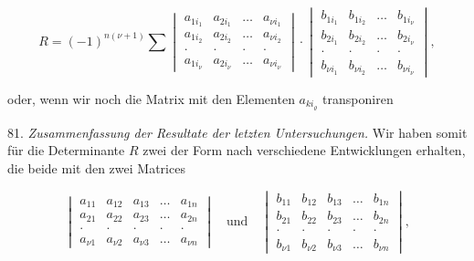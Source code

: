 \[
R=(-1)^{n(\nu+1)}\sum
\begin{vmatrix}
a_{1i_1} & a_{2i_1} & \dots & a_{\nu i_1}\\
a_{1i_2} & a_{2i_2} & \dots & a_{\nu i_2}\\
\cdot & \cdot & \cdot & \cdot\\
a_{1i_\nu} & a_{2i_\nu} & \dots & a_{\nu i_\nu}
\end{vmatrix}
\cdot
\begin{vmatrix}
b_{1i_1} & b_{1i_2} & \dots & b_{1i_\nu}\\
b_{2i_1} & b_{2i_2} & \dots & b_{2i_\nu}\\
\cdot & \cdot & \cdot & \cdot\\
b_{\nu i_1} & b_{\nu i_2} & \dots & b_{\nu i_\nu}
\end{vmatrix},
\]

oder, wenn wir noch die Matrix mit den Elementen $a_{k i_\varrho}$ transponiren


81. \textit{Zusammenfassung der Resultate der letzten Untersuchungen.} Wir haben somit für die Determinante $R$ zwei der Form nach verschiedene Entwicklungen erhalten, die beide mit den zwei Matrices

\[
\begin{vmatrix}
a_{11} & a_{12} & a_{13} & \dots & a_{1n}\\
a_{21} & a_{22} & a_{23} & \dots & a_{2n}\\
\cdot & \cdot & \cdot & \cdot & \cdot\\
a_{\nu 1} & a_{\nu 2} & a_{\nu 3} & \dots & a_{\nu n}
\end{vmatrix}
\quad\text{und}\quad
\begin{vmatrix}
b_{11} & b_{12} & b_{13} & \dots & b_{1n}\\
b_{21} & b_{22} & b_{23} & \dots & b_{2n}\\
\cdot & \cdot & \cdot & \cdot & \cdot\\
b_{\nu 1} & b_{\nu 2} & b_{\nu 3} & \dots & b_{\nu n}
\end{vmatrix},
\]

